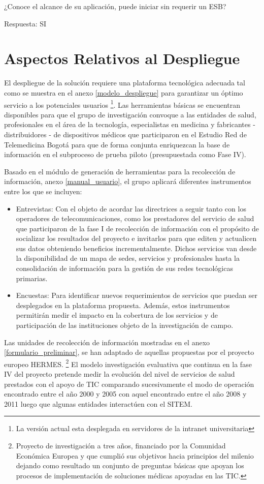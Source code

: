 ¿Conoce el alcance de su aplicación, puede iniciar sin requerir un ESB?

Respuesta: SI


\chapter {Aspectos Relativos al Despliegue}

El despliegue de la solución requiere una plataforma tecnológica adecuada tal como se muestra en el anexo \ref{modelo_despliegue} para garantizar un óptimo servicio a los potenciales usuarios \footnote{La versión actual esta desplegada en servidores de la intranet universitaria}. Las herramientas básicas se encuentran disponibles para que el grupo de investigación convoque a las entidades de salud, profesionales en el área de la tecnología, especialistas en medicina y fabricantes - distribuidores - de dispositivos médicos que participaron en el Estudio Red de Telemedicina Bogotá \cite{aparicio2000} para que de forma conjunta enriquezcan la base de información en el subproceso de prueba piloto (presupuestada como Fase IV).

Basado en el módulo de generación de herramientas para la recolección de información, anexo \ref{manual_usuario}, el grupo aplicará diferentes instrumentos entre los que se incluyen:

\begin{itemize}
\item Entrevistas: Con el objeto de acordar las directrices a seguir tanto con los operadores de telecomunicaciones, como los prestadores del servicio de salud que participaron de la fase I de recolección de información con el propósito de socializar los resultados del proyecto e invitarlos para que editen y actualicen sus datos obteniendo beneficios incrementalmente. Dichos servicios van desde la disponibilidad de un mapa de sedes, servicios y profesionales hasta la consolidación de información para la gestión de sus redes tecnológicas primarias.

\item Encuestas: Para identificar nuevos requerimientos de servicios que puedan ser desplegados en la plataforma propuesta. Además, estos instrumentos permitirán medir el impacto en la cobertura de los servicios y de participación de las instituciones objeto de la investigación de campo.
\end{itemize}

Las unidades de recolección de información mostradas en el anexo \ref{formulario_preliminar}, se han adaptado de aquellas propuestas por el proyecto europeo HERMES. \footnote{Proyecto de investigación a tres años, financiado por la Comunidad Económica Europea y que cumplió sus objetivos hacia principios del milenio dejando como resultado un conjunto de preguntas básicas que apoyan los procesos de implementación de soluciones médicas apoyadas en las TIC.} El modelo investigación evaluativa que continua en la fase IV del proyecto pretende medir la evolución del nivel de servicios de salud prestados con el apoyo de TIC comparando sucesivamente el modo de operación encontrado entre el año 2000 y 2005 con aquel encontrado entre el año 2008 y 2011 luego que algunas entidades interactúen con el SITEM.

